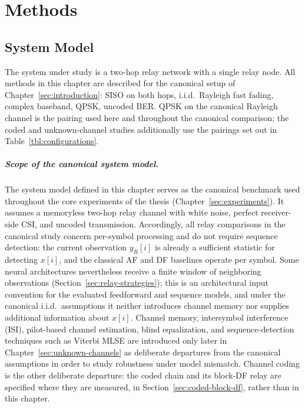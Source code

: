 \chapter{Methods}\label{sec:methods}

\section{System Model}\label{sec:system-model-1}

The system under study is a two-hop relay network with a single relay node. All methods in this chapter are described for the canonical setup of Chapter~\ref{sec:introduction}: SISO on both hops, i.i.d.\ Rayleigh fast fading, complex baseband, QPSK, uncoded BER. QPSK on the canonical Rayleigh channel is the pairing used here and throughout the canonical comparison; the coded and unknown-channel studies additionally use the pairings set out in Table~\ref{tbl:configurations}.

\paragraph{Scope of the canonical system model.} The system model defined in this chapter serves as the canonical benchmark used throughout the core experiments of the thesis (Chapter~\ref{sec:experiments}). It assumes a memoryless two-hop relay channel with white noise, perfect receiver-side CSI, and uncoded transmission. Accordingly, all relay comparisons in the canonical study concern per-symbol processing and do not require sequence detection: the current observation $y_R[i]$ is already a sufficient statistic for detecting $x[i]$, and the classical AF and DF baselines operate per symbol. Some neural architectures nevertheless receive a finite window of neighboring observations (Section~\ref{sec:relay-strategies}); this is an architectural input convention for the evaluated feedforward and sequence models, and under the canonical i.i.d.\ assumptions it neither introduces channel memory nor supplies additional information about $x[i]$. Channel memory, intersymbol interference (ISI), pilot-based channel estimation, blind equalization, and sequence-detection techniques such as Viterbi MLSE are introduced only later in Chapter~\ref{sec:unknown-channels} as deliberate departures from the canonical assumptions in order to study robustness under model mismatch. Channel coding is the other deliberate departure: the coded chain and its block-DF relay are specified where they are measured, in Section~\ref{sec:coded-block-df}, rather than in this chapter.

